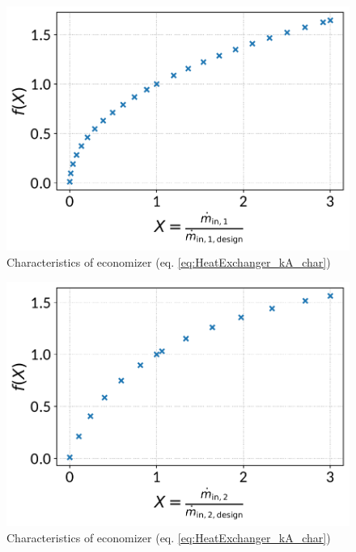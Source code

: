 \begin{minipage}{0.5\textwidth}
\begin{figure}[H]\begin{center}
\includegraphics[width=\textwidth]{figures/HeatExchanger_CharLine_kA_char1_economizer.pdf}
\caption{Characteristics of economizer (eq. \ref{eq:HeatExchanger_kA_char})}
\label{fig:CharLine_kA_char1_economizer}
\end{center}\end{figure}

\end{minipage}
\begin{minipage}{0.5\textwidth}
\begin{figure}[H]\begin{center}
\includegraphics[width=\textwidth]{figures/HeatExchanger_CharLine_kA_char2_economizer.pdf}
\caption{Characteristics of economizer (eq. \ref{eq:HeatExchanger_kA_char})}
\label{fig:CharLine_kA_char2_economizer}
\end{center}\end{figure}

\end{minipage}


